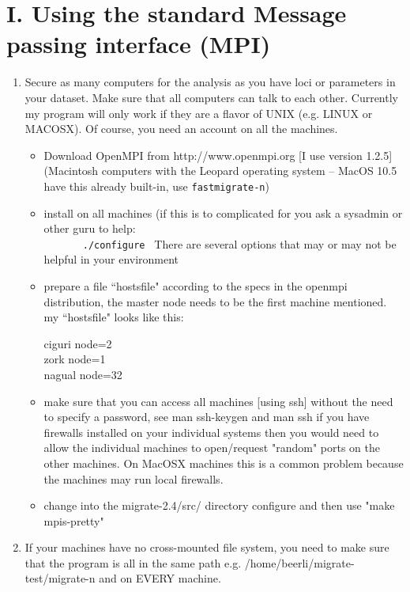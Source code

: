 \section{I. Using the standard Message passing interface (MPI)}

\begin{enumerate}
\item  Secure as many computers for the analysis as you have loci or parameters
    in your dataset. Make sure that all computers can talk to each
    other. Currently my program will only work if they are a flavor of 
    UNIX (e.g. LINUX or MACOSX). Of course, you need an account on all 
    the machines.
  \begin{itemize}
  \item   Download OpenMPI from  http://www.openmpi.org [I use version 1.2.5] (Macintosh computers with the Leopard operating system -- MacOS 10.5 have this already built-in, use {\tt fastmigrate-n})
    \item install on all machines (if this is to complicated for you ask a
      sysadmin or other guru to help:\\
      ~~~~~~\texttt{ ./configure }
      There are several options that may or may not be helpful in your environment
     \item prepare a file ``hostsfile" according to the specs in the openmpi distribution, the master node
      needs to be the first machine mentioned.
      my ``hostsfile" looks like this:\\
      \begin{tt}
      ciguri node=2\\
      zork  node=1\\
      nagual node=32
      \end{tt}	      
\item make sure that you can access all machines [using ssh]
     without the need to specify a password, see man ssh-keygen and man ssh
     if you have firewalls installed on your individual systems then you would need to allow
     the individual machines to open/request "random" ports on the other machines. 
     On MacOSX machines this is a common problem because the machines may run local firewalls.
\item change into the migrate-2.4/src/ directory
      configure and then use "make mpis-pretty" 
\end{itemize}      

\item If your machines have no cross-mounted file system,
    you need to make sure that the program is all
    in the same path e.g. /home/beerli/migrate-test/migrate-n and on EVERY machine.
    

\end{enumerate}
